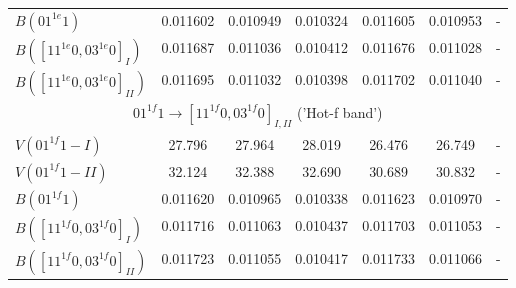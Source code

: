 \documentclass{report}
\begin{document}
\begin{appendices}
\begin{table}
\begin{tabular}{|l|cccccc|}
$B(01^{1e}1)$                 & 0.011602 & 0.010949 & 0.010324 & 0.011605 & 0.010953 & -\\
$B([11^{1e}0,03^{1e}0]_I)$    & 0.011687 & 0.011036 & 0.010412 & 0.011676 & 0.011028 & -\\
$B([11^{1e}0,03^{1e}0]_{II})$ & 0.011695 & 0.011032 & 0.010398 & 0.011702 & 0.011040 & -\\
\hline
\multicolumn{7}{|c|}{$01^{1f}1\rightarrow[11^{1f}0,03^{1f}0]_{I,II}$ ('Hot-f band')}\\
\hline
$V(01^{1f}1-I)$               & 27.796 & 27.964 & 28.019 & 26.476 & 26.749 & -\\
$V(01^{1f}1-II)$              & 32.124 & 32.388 & 32.690 & 30.689 & 30.832 & -\\
$B(01^{1f}1)$                 & 0.011620 & 0.010965 & 0.010338 & 0.011623 & 0.010970 & -\\
$B([11^{1f}0,03^{1f}0]_I)$    & 0.011716 & 0.011063 & 0.010437 & 0.011703 & 0.011053 & -\\
$B([11^{1f}0,03^{1f}0]_{II})$ & 0.011723 & 0.011055 & 0.010417 & 0.011733 & 0.011066 & -\\
\hline
\end{tabular}
\end{table}


\end{appendices}
\end{document}
